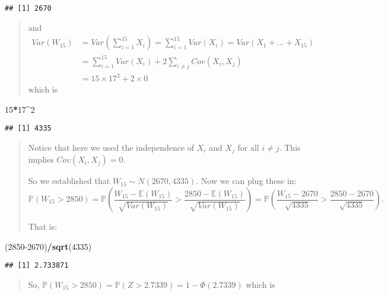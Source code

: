 \documentclass[
]{article}
\newenvironment{Shaded}{\begin{snugshade}}{\end{snugshade}}
\newcommand{\DecValTok}[1]{\textcolor[rgb]{0.00,0.00,0.81}{#1}}
\newcommand{\FunctionTok}[1]{\textcolor[rgb]{0.13,0.29,0.53}{\textbf{#1}}}
\newcommand{\NormalTok}[1]{#1}
\newcommand{\SpecialCharTok}[1]{\textcolor[rgb]{0.81,0.36,0.00}{\textbf{#1}}}
\begin{document}
\begin{verbatim}
## [1] 2670
\end{verbatim}

\begin{quote}
and \[
\begin{aligned}
Var(W_{15})& = Var\left(\displaystyle\sum_{i=1}^{15}X_i\right) = \displaystyle\sum_{i=1}^{15}Var(X_i) = Var(X_1 + ... +X_{15})
\\
& =\displaystyle\sum_{i=1}^{15}Var(X_i) + 2\displaystyle\sum_{i\neq j}Cov(X_i, X_j) 
\\
& = 15 \times 17^2 + 2\times 0
\end{aligned}
\] which is
\end{quote}

\begin{Shaded}
\begin{Highlighting}[]
\DecValTok{15}\SpecialCharTok{*}\DecValTok{17}\SpecialCharTok{\^{}}\DecValTok{2}
\end{Highlighting}
\end{Shaded}

\begin{verbatim}
## [1] 4335
\end{verbatim}

\begin{quote}
Notice that here we used the independence of \(X_i\) and \(X_j\) for all
\(i\neq j\). This implies \(Cov(X_i, X_j) = 0.\)

So we established that \(W_{15} \sim N(2670, 4335).\) Now we can plug
these in: \[
\mathbb{P}(W_{15} > 2850) = \mathbb{P}\left(\frac{W_{15} - \mathbb{E}(W_{15})}{\sqrt{Var(W_{15})}} > \frac{2850 - \mathbb{E}(W_{15})}{\sqrt{Var(W_{15})}}  \right) = \mathbb{P}\left(\frac{W_{15} - 2670}{\sqrt{4335}} > \frac{2850 - 2670}{\sqrt{4335}}  \right).
\]

That is:
\end{quote}

\begin{Shaded}
\begin{Highlighting}[]
\NormalTok{(}\DecValTok{2850{-}2670}\NormalTok{)}\SpecialCharTok{/}\FunctionTok{sqrt}\NormalTok{(}\DecValTok{4335}\NormalTok{)}
\end{Highlighting}
\end{Shaded}

\begin{verbatim}
## [1] 2.733871
\end{verbatim}

\begin{quote}
So,
\(\mathbb{P}(W_{15} > 2850) = \mathbb{P}(Z > 2.7339) = 1 - \Phi(2.7339)\)
which is
\end{quote}
\end{document}
